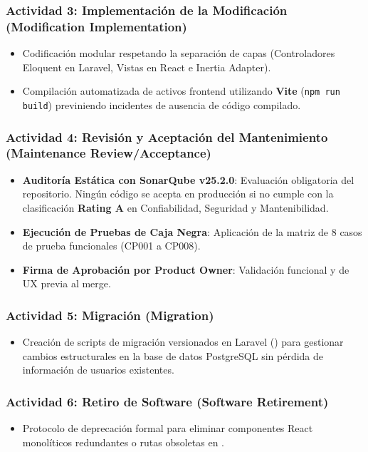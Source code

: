 \documentclass[12pt]{article}
\begin{document}
\subsubsection{Actividad 3: Implementación de la Modificación (Modification Implementation)}
\begin{itemize}
    \item Codificación modular respetando la separación de capas (Controladores Eloquent en Laravel, Vistas en React e Inertia Adapter).
    \item Compilación automatizada de activos frontend utilizando \textbf{Vite} (\texttt{npm run build}) previniendo incidentes de ausencia de código compilado.
\end{itemize}

\subsubsection{Actividad 4: Revisión y Aceptación del Mantenimiento (Maintenance Review/Acceptance)}
\begin{itemize}
    \item \textbf{Auditoría Estática con SonarQube v25.2.0}: Evaluación obligatoria del repositorio. Ningún código se acepta en producción si no cumple con la clasificación \textbf{Rating A} en Confiabilidad, Seguridad y Mantenibilidad.
    \item \textbf{Ejecución de Pruebas de Caja Negra}: Aplicación de la matriz de 8 casos de prueba funcionales (CP001 a CP008).
    \item \textbf{Firma de Aprobación por Product Owner}: Validación funcional y de UX previa al merge.
\end{itemize}

\subsubsection{Actividad 5: Migración (Migration)}
\begin{itemize}
    \item Creación de scripts de migración versionados en Laravel () para gestionar cambios estructurales en la base de datos PostgreSQL sin pérdida de información de usuarios existentes.
\end{itemize}

\subsubsection{Actividad 6: Retiro de Software (Software Retirement)}
\begin{itemize}
    \item Protocolo de deprecación formal para eliminar componentes React monolíticos redundantes o rutas obsoletas en .
\end{itemize}
\end{document}
